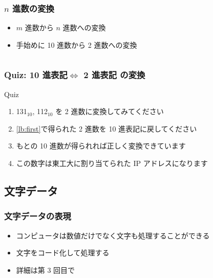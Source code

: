 \begin{frame}[label=Dec2Bin]
\frametitle{$n$ 進数の変換}
  \begin{itemize}
\item $m$ 進数から $n$ 進数への変換
\item 手始めに 10 進数から 2 進数への変換
  \end{itemize}
  \begin{center}
   \begin{example}[10進$\Leftrightarrow$2進]
   \begin{columns}[t]
    \begin{column}{3cm}
    \end{column}
    \begin{column}{3cm}
    \end{column}
   \end{columns}
   \end{example}
  \end{center}
\end{frame}
\begin{frame}
\frametitle{Quiz: 10 進表記$\Leftrightarrow$ 2 進表記 の変換}
  \begin{block}{Quiz}
    \begin{enumerate}
\item 131$_{10}$, 112$_{10}$ を 2 進数に変換してみてください\label{lb:first}
\item \ref{lb:first}で得られた 2 進数を 10 進表記に戻してください
\item もとの 10 進数が得られれば正しく変換できています
\item この数字は東工大に割り当てられた IP アドレスになります
    \end{enumerate}
  \end{block}
\end{frame}
%
%
%
%
\subsection{文字データ}
\begin{frame}
\frametitle{文字データの表現}
  \begin{itemize}
\item コンピュータは数値だけでなく文字も処理することができる
\item 文字をコード化して処理する
\item 詳細は第 3 回目で
  \end{itemize}
\end{frame}
%
%
